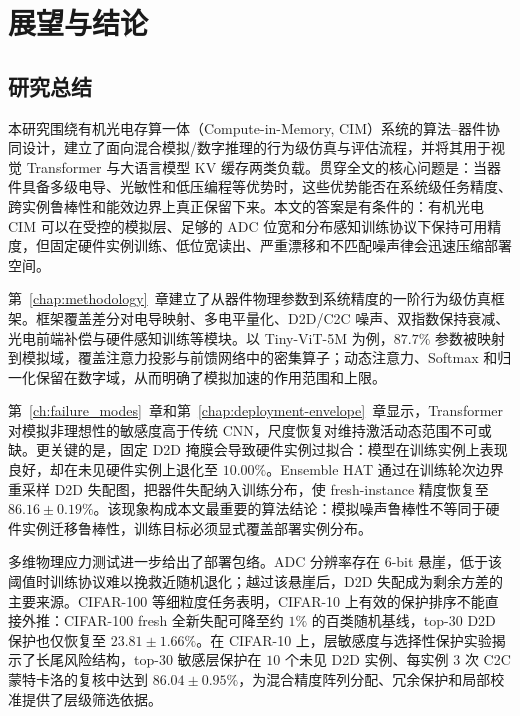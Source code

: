 \FloatBarrier

\chapter{展望与结论}
\label{ch:outlook}

\FloatBarrier

\section{研究总结}

本研究围绕有机光电存算一体（Compute-in-Memory, CIM）系统的算法--器件协同设计，建立了面向混合模拟/数字推理的行为级仿真与评估流程，并将其用于视觉 Transformer 与大语言模型 KV 缓存两类负载。贯穿全文的核心问题是：当器件具备多级电导、光敏性和低压编程等优势时，这些优势能否在系统级任务精度、跨实例鲁棒性和能效边界上真正保留下来。本文的答案是有条件的：有机光电 CIM 可以在受控的模拟层、足够的 ADC 位宽和分布感知训练协议下保持可用精度，但固定硬件实例训练、低位宽读出、严重漂移和不匹配噪声律会迅速压缩部署空间。

第~\ref{chap:methodology}~章建立了从器件物理参数到系统精度的一阶行为级仿真框架。框架覆盖差分对电导映射、多电平量化、D2D/C2C 噪声、双指数保持衰减、光电前端补偿与硬件感知训练等模块。以 Tiny-ViT-5M 为例，$87.7\%$ 参数被映射到模拟域，覆盖注意力投影与前馈网络中的密集算子；动态注意力、Softmax 和归一化保留在数字域，从而明确了模拟加速的作用范围和上限。

第~\ref{ch:failure_modes}~章和第~\ref{chap:deployment-envelope}~章显示，Transformer 对模拟非理想性的敏感度高于传统 CNN，尺度恢复对维持激活动态范围不可或缺。更关键的是，固定 D2D 掩膜会导致硬件实例过拟合：模型在训练实例上表现良好，却在未见硬件实例上退化至 $10.00\%$。Ensemble HAT 通过在训练轮次边界重采样 D2D 失配图，把器件失配纳入训练分布，使 fresh-instance 精度恢复至 $86.16\pm0.19\%$。该现象构成本文最重要的算法结论：模拟噪声鲁棒性不等同于硬件实例迁移鲁棒性，训练目标必须显式覆盖部署实例分布。

多维物理应力测试进一步给出了部署包络。ADC 分辨率存在 6-bit 悬崖，低于该阈值时训练协议难以挽救近随机退化；越过该悬崖后，D2D 失配成为剩余方差的主要来源。CIFAR-100 等细粒度任务表明，CIFAR-10 上有效的保护排序不能直接外推：CIFAR-100 fresh 全新失配可降至约 $1\%$ 的百类随机基线，top-$30$ D2D 保护也仅恢复至 $23.81\pm1.66\%$。在 CIFAR-10 上，层敏感度与选择性保护实验揭示了长尾风险结构，top-$30$ 敏感层保护在 $10$ 个未见 D2D 实例、每实例 $3$ 次 C2C 蒙特卡洛的复核中达到 $86.04\pm0.95\%$，为混合精度阵列分配、冗余保护和局部校准提供了层级筛选依据。

